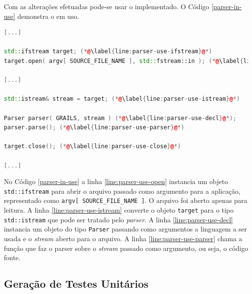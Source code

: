 Com as alterações efetuadas pode-se usar o \parser implementado. O Código
\ref{parser-in-use} demonstra o \parser em uso.

\begin{lstlisting}[language=C++, label=parser-in-use, caption=\textsf{Parser} em uso]
[...]

std::ifstream target; (*@\label{line:parser-use-ifstream}@*)
target.open( argv[ SOURCE_FILE_NAME ], std::fstream::in ); (*@\label{line:parser-use-open}@*)

[...]

std::istream& stream = target; (*@\label{line:parser-use-istream}@*)

Parser parser( GRAILS, stream ) (*@\label{line:parser-use-decl}@*);
parser.parse(); (*@\label{line:parser-use-parser}@*)

target.close(); (*@\label{line:parser-use-close}@*)

[...]
\end{lstlisting}

No Código \ref{parser-in-use} a linha \ref{line:parser-use-open} instancia um
objeto \lstinline|std::ifstream| para abrir o arquivo passado como argumento para
a aplicação, representado como \lstinline|argv[ SOURCE_FILE_NAME ]|. O arquivo foi
aberto apenas para leitura. A linha \ref{line:parser-use-istream} converte o
objeto \lstinline|target| para o tipo \lstinline|std::istream| que pode ser tratado
pelo \textit{parser}. A linha \ref{line:parser-use-decl} instancia um objeto do
tipo \lstinline|Parser| passando como argumentos a linguagem a ser usada e o
\textit{stream} aberto para o arquivo. A linha \ref{line:parser-use-parser} chama
a função que faz o {parser} sobre o \textit{stream} passado como argumento, ou seja,
o código fonte.

\subsection{Geração de Testes Unitários}


